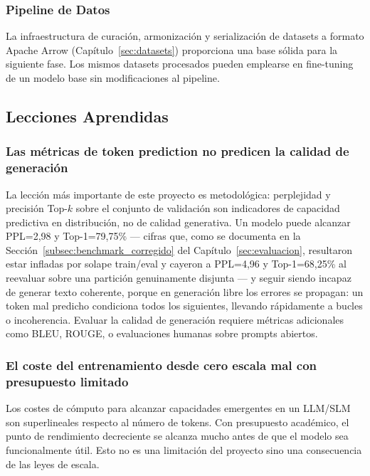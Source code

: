 \subsubsection{Pipeline de Datos}

La infraestructura de curación, armonización y serialización de datasets a formato Apache Arrow (Capítulo~\ref{sec:datasets}) proporciona una base sólida para la siguiente fase. Los mismos datasets procesados pueden emplearse en fine-tuning de un modelo base sin modificaciones al pipeline.

\subsection{Lecciones Aprendidas}

\subsubsection{Las métricas de token prediction no predicen la calidad de generación}

La lección más importante de este proyecto es metodológica: perplejidad y precisión Top-$k$ sobre el conjunto de validación son indicadores de capacidad predictiva en distribución, no de calidad generativa. Un modelo puede alcanzar PPL=2,98 y Top-1=79,75\% --- cifras que, como se documenta en la Sección~\ref{subsec:benchmark_corregido} del Capítulo~\ref{sec:evaluacion}, resultaron estar infladas por solape train/eval y cayeron a PPL=4,96 y Top-1=68,25\% al reevaluar sobre una partición genuinamente disjunta --- y seguir siendo incapaz de generar texto coherente, porque en generación libre los errores se propagan: un token mal predicho condiciona todos los siguientes, llevando rápidamente a bucles o incoherencia. Evaluar la calidad de generación requiere métricas adicionales como BLEU, ROUGE, o evaluaciones humanas sobre prompts abiertos.

\subsubsection{El coste del entrenamiento desde cero escala mal con presupuesto limitado}

Los costes de cómputo para alcanzar capacidades emergentes en un LLM/SLM son superlineales respecto al número de tokens. Con presupuesto académico, el punto de rendimiento decreciente se alcanza mucho antes de que el modelo sea funcionalmente útil. Esto no es una limitación del proyecto sino una consecuencia de las leyes de escala.

